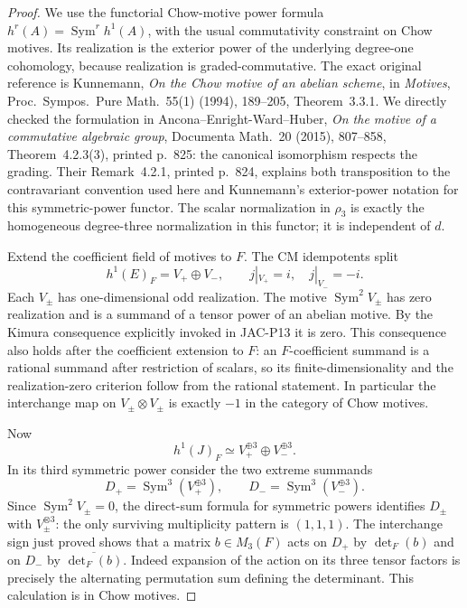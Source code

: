 \begin{proof}
We use the functorial Chow-motive power formula
$h^r(A)=\operatorname{Sym}^r h^1(A)$, with the usual commutativity
constraint on Chow motives. Its realization is the exterior power
of the underlying degree-one cohomology, because realization is
graded-commutative. The exact original reference is Kunnemann,
\emph{On the Chow motive of an abelian scheme}, in \emph{Motives},
Proc.\ Sympos.\ Pure Math.\ 55(1) (1994), 189--205,
Theorem~3.3.1. We directly checked the formulation in
Ancona--Enright-Ward--Huber, \emph{On the motive of a commutative
algebraic group}, Documenta Math.\ 20 (2015), 807--858,
Theorem~4.2.3(3), printed p.~825: the canonical isomorphism respects
the grading. Their Remark~4.2.1, printed p.~824, explains both
transposition to the contravariant convention used here and
Kunnemann's exterior-power notation for this symmetric-power functor.
The scalar normalization in $\rho_3$ is exactly the homogeneous
degree-three normalization in this functor; it is independent of $d$.

Extend the coefficient field of motives to $F$. The CM idempotents
split
\[
 h^1(E)_F=V_+\oplus V_-,
 \qquad j|_{V_+}=i,\quad j|_{V_-}=-i.
\]
Each $V_\pm$ has one-dimensional odd realization.
The motive $\operatorname{Sym}^2 V_\pm$ has zero realization and
is a summand of a tensor power of an abelian motive. By the
Kimura consequence explicitly invoked in JAC-P13 it is zero.
This consequence also holds after the coefficient extension to $F$:
an $F$-coefficient summand is a rational summand after restriction
of scalars, so its finite-dimensionality and the realization-zero
criterion follow from the rational statement.
In particular the interchange map on $V_\pm\otimes V_\pm$ is
exactly $-1$ in the category of Chow motives.

Now
\[
 h^1(J)_F\simeq V_+^{\oplus3}\oplus V_-^{\oplus3}.
\]
In its third symmetric power consider the two extreme summands
\[
 D_+=\operatorname{Sym}^3(V_+^{\oplus3}),\qquad
 D_-=\operatorname{Sym}^3(V_-^{\oplus3}).               \tag{JAC.P14.4}
\]
Since $\operatorname{Sym}^2V_\pm=0$, the direct-sum formula for
symmetric powers identifies $D_\pm$ with $V_\pm^{\otimes3}$:
the only surviving multiplicity pattern is $(1,1,1)$.
The interchange sign just proved shows that a matrix
$b\in M_3(F)$ acts on $D_+$ by $\det_F(b)$ and on $D_-$ by
$\overline{\det_F(b)}$. Indeed expansion of the action on its
three tensor factors is precisely the alternating permutation sum
defining the determinant. This calculation is in Chow motives.


\end{proof}
